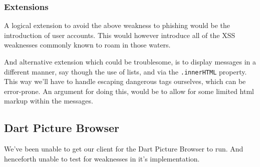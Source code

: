 \subsubsection*{Extensions}
A logical extension to avoid the above weakness to phishing would be the introduction of user accounts.
This would however introduce all of the XSS weaknesses commonly known to roam in those waters.

And alternative extension which could be troublesome, is to display messages in a different manner, say though the use of lists, and via the \verb|.innerHTML| property.
This way we'll have to handle escaping dangerous tags ourselves, which can be error-prone.
An argument for doing this, would be to allow for some limited html markup within the messages.

\subsection*{Dart Picture Browser}
We've been unable to get our client for the Dart Picture Browser to run.
And henceforth unable to test for weaknesses in it's implementation.
